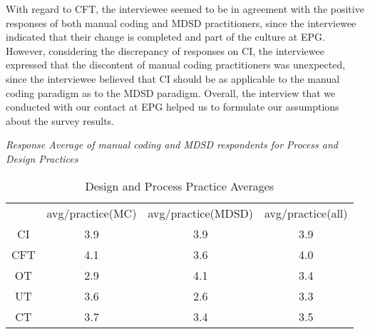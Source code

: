 \documentclass[final_report_innit.tex]{subfiles}
\newcommand\Tstrut{\rule{0pt}{2.6ex}}       %
\begin{document}
With regard to CFT, the interviewee seemed to be in agreement with the positive responses of both manual coding and MDSD practitioners, since the interviewee indicated that their change is completed and part of the culture at EPG. However, considering the discrepancy of responses on CI, the interviewee expressed that the discontent of manual coding practitioners was unexpected, since the interviewee believed that CI should be as applicable to the manual coding paradigm as to the MDSD paradigm. Overall, the interview that we conducted with our contact at EPG helped us to formulate our assumptions about the survey results. 
\\


\begin{center}\textit{Response Average of manual coding and MDSD respondents for Process and Design Practices}\end{center}

\begin{table}[h]
	\caption{Design and Process Practice Averages}
	\begin{center}
		\begin{tabular}{cccc}
		           & avg/practice(MC) & avg/practice(MDSD) & avg/practice(all) \Tstrut \\ 
			CI  & 3.9 & 3.9 & 3.9 \Tstrut \\  
			CFT & 4.1 & 3.6 & 4.0 \Tstrut \\ 
			OT  & 2.9 & 4.1 & 3.4 \Tstrut \\ 
			UT  & 3.6 & 2.6 & 3.3 \Tstrut \\ 
			CT  & 3.7 & 3.4 & 3.5 \Tstrut \\ 

		\end{tabular}
	\end{center}
\end{table}
\end{document}
